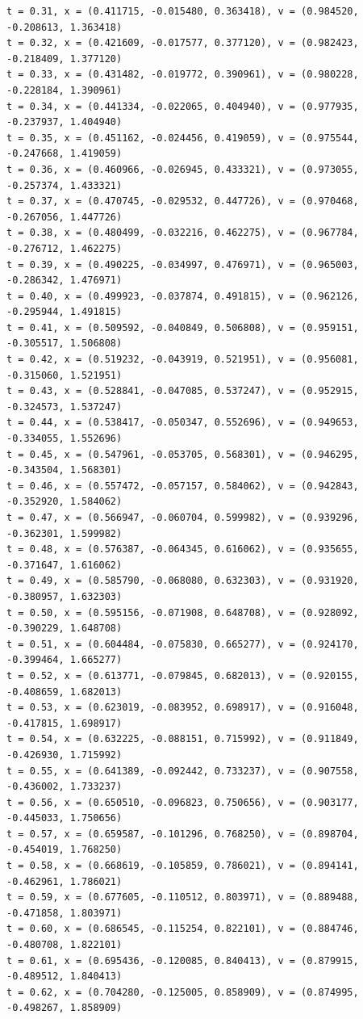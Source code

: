 \documentclass[a4j,titlepage]{jsarticle}
\begin{document}
\begin{lstlisting}[style=text,caption=課題10の実行結果,label=lst:kekka10]
t = 0.31, x = (0.411715, -0.015480, 0.363418), v = (0.984520, -0.208613, 1.363418)
t = 0.32, x = (0.421609, -0.017577, 0.377120), v = (0.982423, -0.218409, 1.377120)
t = 0.33, x = (0.431482, -0.019772, 0.390961), v = (0.980228, -0.228184, 1.390961)
t = 0.34, x = (0.441334, -0.022065, 0.404940), v = (0.977935, -0.237937, 1.404940)
t = 0.35, x = (0.451162, -0.024456, 0.419059), v = (0.975544, -0.247668, 1.419059)
t = 0.36, x = (0.460966, -0.026945, 0.433321), v = (0.973055, -0.257374, 1.433321)
t = 0.37, x = (0.470745, -0.029532, 0.447726), v = (0.970468, -0.267056, 1.447726)
t = 0.38, x = (0.480499, -0.032216, 0.462275), v = (0.967784, -0.276712, 1.462275)
t = 0.39, x = (0.490225, -0.034997, 0.476971), v = (0.965003, -0.286342, 1.476971)
t = 0.40, x = (0.499923, -0.037874, 0.491815), v = (0.962126, -0.295944, 1.491815)
t = 0.41, x = (0.509592, -0.040849, 0.506808), v = (0.959151, -0.305517, 1.506808)
t = 0.42, x = (0.519232, -0.043919, 0.521951), v = (0.956081, -0.315060, 1.521951)
t = 0.43, x = (0.528841, -0.047085, 0.537247), v = (0.952915, -0.324573, 1.537247)
t = 0.44, x = (0.538417, -0.050347, 0.552696), v = (0.949653, -0.334055, 1.552696)
t = 0.45, x = (0.547961, -0.053705, 0.568301), v = (0.946295, -0.343504, 1.568301)
t = 0.46, x = (0.557472, -0.057157, 0.584062), v = (0.942843, -0.352920, 1.584062)
t = 0.47, x = (0.566947, -0.060704, 0.599982), v = (0.939296, -0.362301, 1.599982)
t = 0.48, x = (0.576387, -0.064345, 0.616062), v = (0.935655, -0.371647, 1.616062)
t = 0.49, x = (0.585790, -0.068080, 0.632303), v = (0.931920, -0.380957, 1.632303)
t = 0.50, x = (0.595156, -0.071908, 0.648708), v = (0.928092, -0.390229, 1.648708)
t = 0.51, x = (0.604484, -0.075830, 0.665277), v = (0.924170, -0.399464, 1.665277)
t = 0.52, x = (0.613771, -0.079845, 0.682013), v = (0.920155, -0.408659, 1.682013)
t = 0.53, x = (0.623019, -0.083952, 0.698917), v = (0.916048, -0.417815, 1.698917)
t = 0.54, x = (0.632225, -0.088151, 0.715992), v = (0.911849, -0.426930, 1.715992)
t = 0.55, x = (0.641389, -0.092442, 0.733237), v = (0.907558, -0.436002, 1.733237)
t = 0.56, x = (0.650510, -0.096823, 0.750656), v = (0.903177, -0.445033, 1.750656)
t = 0.57, x = (0.659587, -0.101296, 0.768250), v = (0.898704, -0.454019, 1.768250)
t = 0.58, x = (0.668619, -0.105859, 0.786021), v = (0.894141, -0.462961, 1.786021)
t = 0.59, x = (0.677605, -0.110512, 0.803971), v = (0.889488, -0.471858, 1.803971)
t = 0.60, x = (0.686545, -0.115254, 0.822101), v = (0.884746, -0.480708, 1.822101)
t = 0.61, x = (0.695436, -0.120085, 0.840413), v = (0.879915, -0.489512, 1.840413)
t = 0.62, x = (0.704280, -0.125005, 0.858909), v = (0.874995, -0.498267, 1.858909)

\end{lstlisting}
\end{document}
